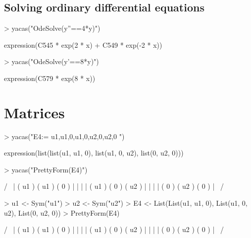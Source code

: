 \documentclass[]{article}
\begin{document}
\subsection{Solving ordinary differential equations}

\begin{Schunk}
\begin{Sinput}
> yacas("OdeSolve(y''==4*y)")
\end{Sinput}
\begin{Soutput}
expression(C545 * exp(2 * x) + C549 * exp(-2 * x))
\end{Soutput}
\begin{Sinput}
> yacas("OdeSolve(y'==8*y)")
\end{Sinput}
\begin{Soutput}
expression(C579 * exp(8 * x))
\end{Soutput}
\end{Schunk}








\section{Matrices}
\label{sec:matrices}
\begin{Schunk}
\begin{Sinput}
> yacas("E4:={ {u1,u1,0},{u1,0,u2},{0,u2,0} }")
\end{Sinput}
\begin{Soutput}
expression(list(list(u1, u1, 0), list(u1, 0, u2), list(0, u2, 
    0)))
\end{Soutput}
\begin{Sinput}
> yacas("PrettyForm(E4)")
\end{Sinput}
\begin{Soutput}
/                       \
| ( u1 ) ( u1 ) ( 0 )   |
|                       |
| ( u1 ) ( 0 )  ( u2 )  |
|                       |
| ( 0 )  ( u2 ) ( 0 )   |
\                       /
\end{Soutput}
\end{Schunk}

\begin{Schunk}
\begin{Sinput}
> u1 <- Sym("u1")
> u2 <- Sym("u2")
> E4 <- List(List(u1, u1, 0), List(u1, 0, u2), List(0, u2, 0))
> PrettyForm(E4)
\end{Sinput}
\begin{Soutput}
/                       \
| ( u1 ) ( u1 ) ( 0 )   |
|                       |
| ( u1 ) ( 0 )  ( u2 )  |
|                       |
| ( 0 )  ( u2 ) ( 0 )   |
\                       /
\end{Soutput}
\end{Schunk}
\end{document}
